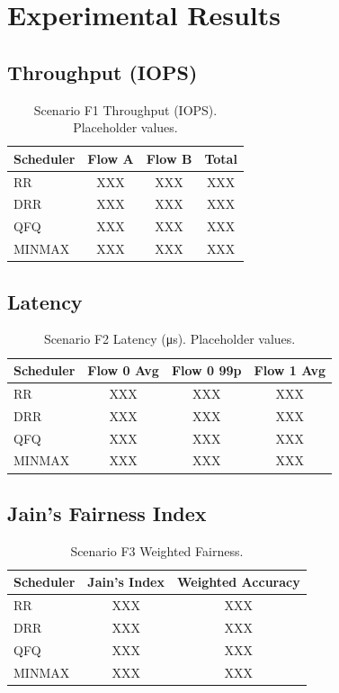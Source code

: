 \documentclass[11pt]{article}
\begin{document}
\section{Experimental Results}

\subsection{Throughput (IOPS)}

\begin{table}[h]
\centering
\caption{Scenario F1 Throughput (IOPS). Placeholder values.}
\begin{tabular}{lccc}
\toprule
Scheduler & Flow A & Flow B & Total \\
\midrule
RR   & XXX & XXX & XXX \\
DRR  & XXX & XXX & XXX \\
QFQ  & XXX & XXX & XXX \\
MINMAX & XXX & XXX & XXX \\
\bottomrule
\end{tabular}
\end{table}

\subsection{Latency}

\begin{table}[h]
\centering
\caption{Scenario F2 Latency (\si{\micro\second}). Placeholder values.}
\begin{tabular}{lccc}
\toprule
Scheduler & Flow 0 Avg & Flow 0 99p & Flow 1 Avg \\
\midrule
RR   & XXX & XXX & XXX \\
DRR  & XXX & XXX & XXX \\
QFQ  & XXX & XXX & XXX \\
MINMAX & XXX & XXX & XXX \\
\bottomrule
\end{tabular}
\end{table}

\subsection{Jain's Fairness Index}

\begin{table}[h]
\centering
\caption{Scenario F3 Weighted Fairness.}
\begin{tabular}{lcc}
\toprule
Scheduler & Jain's Index & Weighted Accuracy \\
\midrule
RR   & XXX & XXX \\
DRR  & XXX & XXX \\
QFQ  & XXX & XXX \\
MINMAX & XXX & XXX \\
\bottomrule
\end{tabular}
\end{table}
\end{document}
